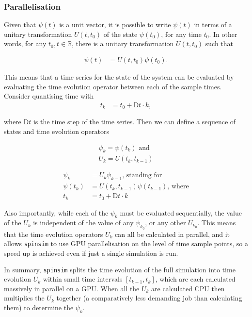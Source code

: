\documentclass{jors}
\begin{document}
		\subsubsection*{Parallelisation}
			Given that \(\psi(t)\) is a unit vector, it is possible to write \(\psi(t)\) in terms of a unitary transformation \(U(t, t_0)\) of the state \(\psi(t_0)\), for any time \(t_0\). In other words, for any \(t_0,t \in \mathbb{R}\), there is a unitary transformation \(U(t, t_0)\) such that
			
			\begin{align*}
				\psi(t) &= U(t, t_0)\psi(t_0).
			\end{align*}
			
			This means that a time series for the state of the system can be evaluated by evaluating the time evolution operator between each of the sample times. Consider quantising time with
			\begin{align*}
				t_k &= t_0 + \mathrm{D}t\cdot k,
			\end{align*}

			where \(\mathrm{D}t\) is the time step of the time series. Then we can define a sequence of states and time evolution operators

			\begin{align*}
				\psi_k = \psi(t_k)\textrm{ and}\\
				U_k = U(t_{k}, t_{k-1})
			\end{align*}
			
			\begin{align*}
				\psi_k &= U_k\psi_{k-1}\textrm{, standing for}\\
				\psi(t_{k}) &= U(t_{k}, t_{k-1})\psi(t_{k-1})\textrm{, where}\\
				t_k &= t_0 + \mathrm{D}t\cdot k
			\end{align*}

			Also importantly, while each of the \(\psi_k\) must be evaluated sequentially, the value of the \(U_k\) is independent of the value of any \(\psi_{k_0}\), or any other \(U_{k_0}\). This means that the time evolution operators \(U_k\) can all be calculated in parallel, and it allows \texttt{spinsim} to use GPU parallelisation on the level of time sample points, so a speed up is achieved even if just a single simulation is run.

			In summary, \texttt{spinsim} splits the time evolution of the full simulation into time evolution \(U_k\) within small time intervals \([t_{k - 1}, t_{k}]\), which are each calculated massively in parallel on a GPU. When all the \(U_k\) are calculated CPU then multiplies the \(U_k\) together (a comparatively less demanding job than calculating them) to determine the \(\psi_k\).
\end{document}
